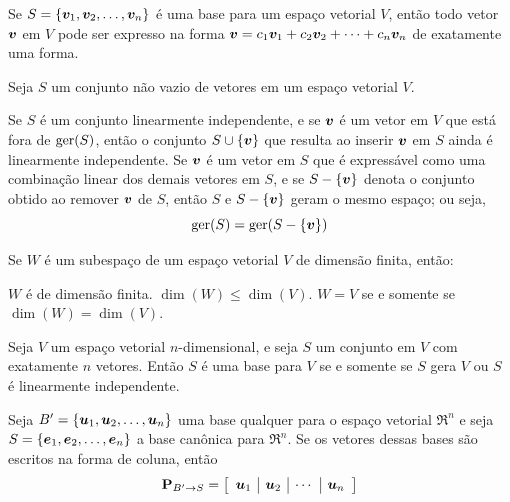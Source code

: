 \begin{theorem}
	Se $S = \{\bm{v}_1,\bm{v}_2,\ldots,\bm{v}_n\}$ é uma base para um espaço vetorial $V$, então todo vetor $\bm{v}$ em $V$ pode ser expresso na forma $\bm{v} = c_1\bm{v}_1 + c_2\bm{v}_2 + \cdots + c_n\bm{v}_n$ de exatamente uma forma.
\end{theorem}

\begin{theorem}
	Seja $S$ um conjunto não vazio de vetores em um espaço vetorial $V$.
	\begin{outline}[enumerate]
		\1 Se $S$ é um conjunto linearmente independente, e se $\bm{v}$ é um vetor em $V$ que está fora de $\operatorname{ger}(S)$, então o conjunto $S\cup\{\bm{v}\}$ que resulta ao inserir $\bm{v}$ em $S$ ainda é linearmente independente.
		\1 Se $\bm{v}$ é um vetor em $S$ que é expressável como uma combinação linear dos demais vetores em $S$, e se $S-\{\bm{v}\}$ denota o conjunto obtido ao remover $\bm{v}$ de $S$, então $S$ e $S-\{\bm{v}\}$ geram o mesmo espaço; ou seja,
		\begin{equation}
			\operatorname{ger}(S) = \operatorname{ger}(S-\{\bm{v}\})
		\end{equation}
	\end{outline}
\end{theorem}

\begin{theorem}
	Se $W$ é um subespaço de um espaço vetorial $V$ de dimensão finita, então:
	\begin{outline}[enumerate]
		\1 $W$ é de dimensão finita.
		\1 $\dim(W) \leq \dim(V)$.
		\1 $W = V$ se e somente se $\dim(W) = \dim(V)$.
	\end{outline}
\end{theorem}

\begin{theorem}
	Seja $V$ um espaço vetorial $n$-dimensional, e seja $S$ um conjunto em $V$ com exatamente $n$ vetores. Então $S$ é uma base para $V$ se e somente se $S$ gera $V$ ou $S$ é linearmente independente.
\end{theorem}

\begin{theorem}
	Seja $B' = \{\bm{u}_1,\bm{u}_2,\ldots,\bm{u}_n\}$ uma base qualquer para o espaço vetorial $\Re^n$ e seja $S = \{\bm{e}_1,\bm{e}_2,\ldots,\bm{e}_n\}$ a base canônica para $\Re^n$. Se os vetores dessas bases são escritos na forma de coluna, então
	\begin{equation}
		\mathbf{P}_{B'\to S} = \left[\begin{array}{c|c|c|c}
			\bm{u}_1 & \bm{u}_2 & \cdots & \bm{u}_n
		\end{array}\right]
	\end{equation}
\end{theorem}


